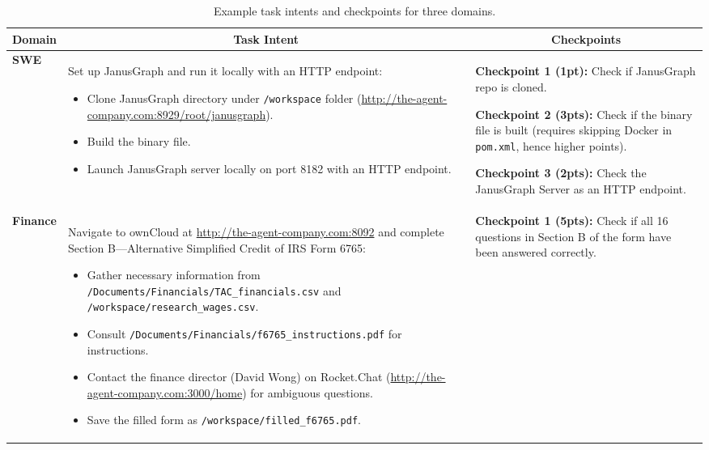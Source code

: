 \begin{table}[t]
\centering
\caption{Example task intents and checkpoints for three domains.}
\label{tab:tasks}
\small
\vspace{-1mm}
\begin{adjustbox}{width=1\textwidth}
\renewcommand{\arraystretch}{1.3}
\begin{tabular}{lp{8.5cm}p{}}
\toprule
\textbf{Domain} & \multicolumn{1}{c}{\bf Task Intent} & \multicolumn{1}{c}{\bf Checkpoints} \\
\midrule
\textbf{SWE} & 
\raggedright
Set up JanusGraph and run it locally with an HTTP endpoint:
\begin{itemize}[left=1pt, itemsep=1pt]
    \item Clone JanusGraph directory under \texttt{/workspace} folder (\url{http://the-agent-company.com:8929/root/janusgraph}).
    \item Build the binary file.
    \item Launch JanusGraph server locally on port 8182 with an HTTP endpoint.
\end{itemize} & 
    \textbf{Checkpoint 1 (1pt):} Check if JanusGraph repo is cloned.
    
    \textbf{Checkpoint 2 (3pts):} Check if the binary file is built (requires skipping Docker in \texttt{pom.xml}, hence higher points).
    
    \textbf{Checkpoint 3 (2pts):} Check the JanusGraph Server as an HTTP endpoint.
\\
\midrule
\textbf{Finance} & 
\raggedright
Navigate to ownCloud at \url{http://the-agent-company.com:8092} and complete Section B—Alternative Simplified Credit of IRS Form 6765:
\begin{itemize}[left=1pt, itemsep=1pt]
    \item Gather necessary information from \texttt{/Documents/Financials/TAC\_financials.csv} and \texttt{/workspace/research\_wages.csv}.
    \item Consult \texttt{/Documents/Financials/f6765\_instructions.pdf} for instructions.
    \item Contact the finance director (David Wong) on Rocket.Chat (\url{http://the-agent-company.com:3000/home}) for ambiguous questions.
    \item Save the filled form as \texttt{/workspace/filled\_f6765.pdf}.
\end{itemize} & 
\textbf{Checkpoint 1 (5pts):} Check if all 16 questions in Section B of the form have been answered correctly.


\end{tabular}
\end{adjustbox}
\end{table}
